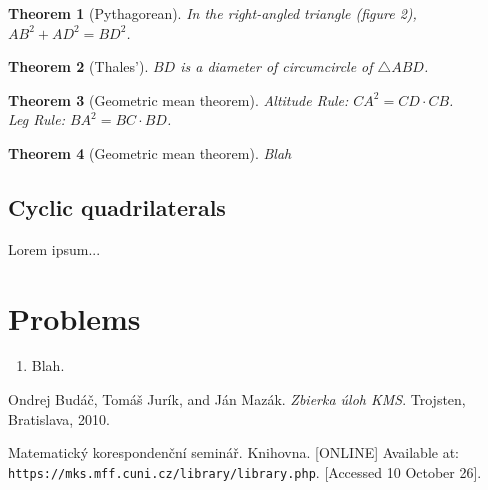 \documentclass[11pt,a5paper]{article}
\newtheorem*{Theorem}{Theorem}
\begin{document}
\begin{Theorem}[Pythagorean]
	In the right-angled triangle (figure 2), $AB^2 + AD^2 = BD^2$.
\end{Theorem}
\begin{Theorem}[Thales']
	$BD$ is a diameter of circumcircle of $\triangle ABD$.
\end{Theorem}
\begin{Theorem}[Geometric mean theorem]
	Altitude Rule: $CA^2 = CD \cdot CB$.\\
	Leg Rule:  $BA^2 = BC \cdot BD$.
\end{Theorem}
\begin{Theorem}[Geometric mean theorem]
	Blah
\end{Theorem}

\subsection*{Cyclic quadrilaterals}

Lorem ipsum...

\section{Problems}


\begin{enumerate}
	\subsection*{Easy}
	
	\subsection*{Medium}	
	
	\subsection*{Difficult}

	\subsection*{Extra}	
	\item{Blah.}

\end{enumerate}

\begin{thebibliography}{9}
 Ondrej Budáč, Tomáš Jurík, and Ján Mazák. 
	\emph{Zbierka úloh KMS}. Trojsten, Bratislava, 2010.
	
 Matematický korespondenční seminář. Knihovna. [ONLINE] Available at: \texttt{https://mks.mff.cuni.cz/library/library.php}. [Accessed 10 October 26].
\end{thebibliography}
\end{document}
